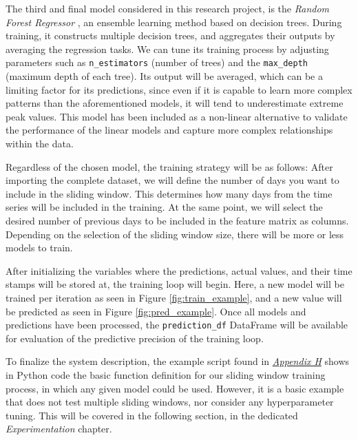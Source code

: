 \documentclass[12pt]{report} %
\begin{document}
The third and final model considered in this research project, is the \textit{Random Forest Regressor} \cite{random_forest_regressor}, an ensemble learning method based on decision trees. During training, it constructs multiple decision trees, and aggregates their outputs by averaging the regression tasks. We can tune its training process by adjusting parameters such as \verb|n_estimators| (number of trees) and the \verb|max_depth| (maximum depth of each tree). Its output will be averaged, which can be a limiting factor for its predictions, since even if it is capable to learn more complex patterns than the aforementioned models, it will tend to underestimate extreme peak values. This model has been included as a non-linear alternative to validate the performance of the linear models and capture more complex relationships within the data.

Regardless of the chosen model, the training strategy will be as follows: After importing the complete dataset, we will define the number of days you want to include in the sliding window. This determines how many days from the time series will be included in the training. At the same point, we will select the desired number of previous days to be included in the feature matrix as columns. Depending on the selection of the sliding window size, there will be more or less models to train.

After initializing the variables where the predictions, actual values, and their time stamps will be stored at, the training loop will begin. Here, a new model will be trained per iteration as seen in Figure \ref{fig:train_example}, and a new value will be predicted as seen in Figure \ref{fig:pred_example}. Once all models and predictions have been processed, the \small{\verb|prediction_df|} DataFrame will be available for evaluation of the predictive precision of the training loop.

To finalize the system description, the example script found in \textit{\hyperref[app:appendix_h_example_basic_training_process]{Appendix H}} shows in Python code the basic function definition for our sliding window training process, in which any given model could be used. However, it is a basic example that does not test multiple sliding windows, nor consider any hyperparameter tuning. This will be covered in the following section, in the dedicated \textit{Experimentation} chapter.



\end{document}
